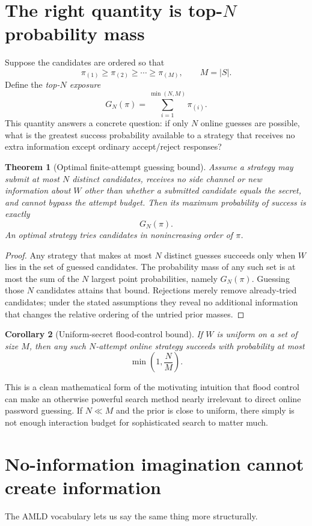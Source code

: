 \documentclass[11pt,openany]{book}
\newtheorem{theorem}{Theorem}[chapter]
\newtheorem{corollary}[theorem]{Corollary}
\theoremstyle{definition}
\theoremstyle{remark}
\begin{document}
\section{The right quantity is top-\texorpdfstring{$N$}{N} probability mass}
Suppose the candidates are ordered so that
\[
\pi_{(1)}\ge \pi_{(2)}\ge\cdots\ge\pi_{(M)},\qquad M=|S|.
\]
Define the \emph{top-$N$ exposure}
\[
G_N(\pi)=\sum_{i=1}^{\min(N,M)}\pi_{(i)}.
\]
This quantity answers a concrete question: if only $N$ online guesses are possible, what is the greatest success probability available to a strategy that receives no extra information except ordinary accept/reject responses?

\begin{theorem}[Optimal finite-attempt guessing bound]\label{thm:topN}
Assume a strategy may submit at most $N$ distinct candidates, receives no side channel or new information about $W$ other than whether a submitted candidate equals the secret, and cannot bypass the attempt budget. Then its maximum probability of success is exactly
\[
G_N(\pi).
\]
An optimal strategy tries candidates in nonincreasing order of $\pi$.
\end{theorem}
\begin{proof}
Any strategy that makes at most $N$ distinct guesses succeeds only when $W$ lies in the set of guessed candidates. The probability mass of any such set is at most the sum of the $N$ largest point probabilities, namely $G_N(\pi)$. Guessing those $N$ candidates attains that bound. Rejections merely remove already-tried candidates; under the stated assumptions they reveal no additional information that changes the relative ordering of the untried prior masses.
\end{proof}

\begin{corollary}[Uniform-secret flood-control bound]\label{cor:uniformN}
If $W$ is uniform on a set of size $M$, then any such $N$-attempt online strategy succeeds with probability at most
\[
\min\left(1,\frac{N}{M}\right).
\]
\end{corollary}

This is a clean mathematical form of the motivating intuition that flood control can make an otherwise powerful search method nearly irrelevant to direct online password guessing. If $N\ll M$ and the prior is close to uniform, there simply is not enough interaction budget for sophisticated search to matter much.

\section{No-information imagination cannot create information}
The AMLD vocabulary lets us say the same thing more structurally.
\end{document}
